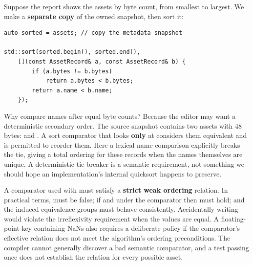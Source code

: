 \hypertarget{01-foundations-i-ch006-the-upload-report-needs-sorted-work-but-what-does-sorted-mean}{}

Suppose the report shows the assets by byte count, from smallest to largest. We make a \textbf{separate copy} of the owned snapshot, then sort it:

\begin{verbatim}
auto sorted = assets; // copy the metadata snapshot

std::sort(sorted.begin(), sorted.end(),
    [](const AssetRecord& a, const AssetRecord& b) {
        if (a.bytes != b.bytes)
            return a.bytes < b.bytes;
        return a.name < b.name;
    });
\end{verbatim}

Why compare names after equal byte counts? Because the editor may want a deterministic secondary order. The source snapshot contains two assets with 48 bytes:  and . A sort comparator that looks \textbf{only} at  considers them equivalent and is permitted to reorder them. Here a lexical name comparison explicitly breaks the tie, giving a total ordering for these records when the names themselves are unique. A deterministic tie-breaker is a semantic requirement, not something we should hope an implementation's internal quicksort happens to preserve.

A comparator used with  must satisfy a \textbf{strict weak ordering} relation. In practical terms,  must be false; if  and  under the comparator then  must hold; and the induced equivalence groups must behave consistently. Accidentally writing  would violate the irreflexivity requirement when the values are equal. A floating-point key containing NaNs also requires a deliberate policy if the comparator's effective relation does not meet the algorithm's ordering preconditions. The compiler cannot generally discover a bad semantic comparator, and a test passing once does not establish the relation for every possible asset.

